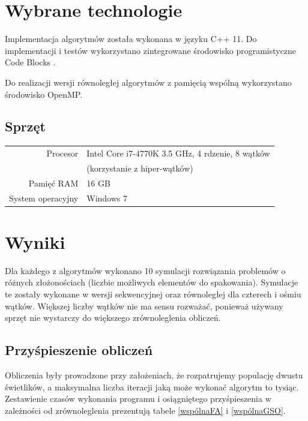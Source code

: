 \documentclass[11pt,a4paper,twoside]{article}
\begin{document}
\section{Wybrane technologie}
Implementacja algorytmów została wykonana w języku C++ 11. Do implementacji i testów wykorzystano zintegrowane środowisko programistyczne Code Blocks .

Do realizacji wersji równoległej algorytmów z pamięcią wspólną wykorzystano środowisko OpenMP.

\subsection{Sprzęt}
\bgroup
\def\arraystretch{1.3}
\begin{tabular}{rl}
\centering
 Procesor & Intel Core i7-4770K 3.5 GHz, 4 rdzenie, 8 wątków  \\
 & (korzystanie z hiper-wątków)\\
 Pamięć RAM &  16 GB\\
 System operacyjny & Windows 7 \\ 

\end{tabular}
\egroup

\section{Wyniki}
Dla każdego z algorytmów wykonano 10 symulacji rozwiązania problemów o różnych złożonościach (liczbie możliwych elementów do spakowania). Symulacje te zostały wykonane w wersji sekwencyjnej oraz równoległej dla czterech i ośmiu wątków. Większej liczby wątków nie ma sensu rozważać, ponieważ używany sprzęt nie wystarczy do większego zrównoleglenia obliczeń.
\subsection{Przyśpieszenie obliczeń}
Obliczenia były prowadzone przy założeniach, że rozpatrujemy populację dwustu świetlików, a maksymalna liczba iteracji jaką może wykonać algorytm to tysiąc. Zestawienie czasów wykonania programu i osiągniętego przyśpieszenia w zależności od zrównoleglenia prezentują tabele \ref{wspólnaFA} i \ref{wspólnaGSO}.
\end{document}
